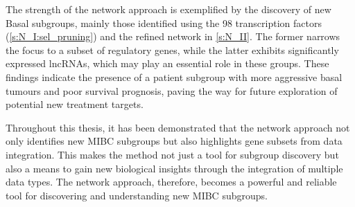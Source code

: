 % 
The strength of the network approach is exemplified by the discovery of new Basal subgroups, mainly those identified using the 98 transcription factors (\cref{s:N_I:sel_pruning}) and the refined network in \cref{s:N_II}. The former narrows the focus to a subset of regulatory genes, while the latter exhibits significantly expressed lncRNAs, which may play an essential role in these groups. These findings indicate the presence of a patient subgroup with more aggressive basal tumours and poor survival prognosis, paving the way for future exploration of potential new treatment targets.

Throughout this thesis, it has been demonstrated that the network approach not only identifies new MIBC subgroups but also highlights gene subsets from data integration. This makes the method not just a tool for subgroup discovery but also a means to gain new biological insights through the integration of multiple data types. The network approach, therefore, becomes a powerful and reliable tool for discovering and understanding new MIBC subgroups.